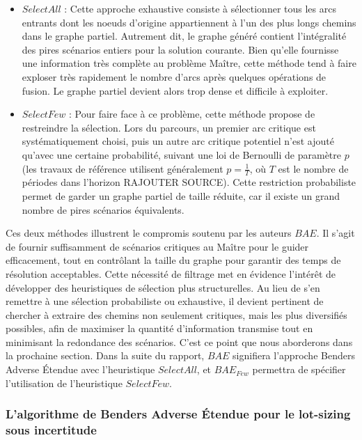 \documentclass[12pt, a4paper, twoside]{report}
\numberwithin{equation}{section}
\begin{document}
\begin{Figure}[H]
	\begin{itemize}
		\item $SelectAll$ : Cette approche exhaustive consiste à sélectionner tous les arcs entrants dont les noeuds d'origine appartiennent à l'un des plus longs chemins dans le graphe partiel. Autrement dit, le graphe généré contient l'intégralité des pires scénarios entiers pour la solution courante. Bien qu'elle fournisse une information très complète au problème Maître, cette méthode tend à faire exploser très rapidement le nombre d'arcs après quelques opérations de fusion. Le graphe partiel devient alors trop dense et difficile à exploiter.
		\item $SelectFew$ : Pour faire face à ce problème, cette méthode propose de restreindre la sélection. Lors du parcours, un premier arc critique est systématiquement choisi, puis un autre arc critique potentiel n'est ajouté qu'avec une certaine probabilité, suivant une loi de Bernoulli de paramètre $p$ (les travaux de référence utilisent généralement $p=\frac{1}{T}$, où $T$ est le nombre de périodes dans l'horizon RAJOUTER SOURCE). Cette restriction probabiliste permet de garder un graphe partiel de taille réduite, car il existe un grand nombre de pires scénarios équivalents.
	\end{itemize}
	
	Ces deux méthodes illustrent le compromis soutenu par les auteurs $BAE$. Il s'agit de fournir suffisamment de scénarios critiques au Maître pour le guider efficacement, tout en contrôlant la taille du graphe pour garantir des temps de résolution acceptables. Cette nécessité de filtrage met en évidence l'intérêt de développer des heuristiques de sélection plus structurelles. Au lieu de s'en remettre à une sélection probabiliste ou exhaustive, il devient pertinent de chercher à extraire des chemins non seulement critiques, mais les plus diversifiés possibles, afin de maximiser la quantité d'information transmise tout en minimisant la redondance des scénarios. C'est ce point que nous aborderons dans la prochaine section. Dans la suite du rapport, $BAE$ signifiera l'approche Benders Adverse Étendue avec l'heuristique $SelectAll$, et $BAE_{Few}$ permettra de spécifier l'utilisation de l'heuristique $SelectFew$.
	
	\subsubsection{L’algorithme de Benders Adverse Étendue pour le lot-sizing sous incertitude }
	

\end{Figure}
\end{document}
